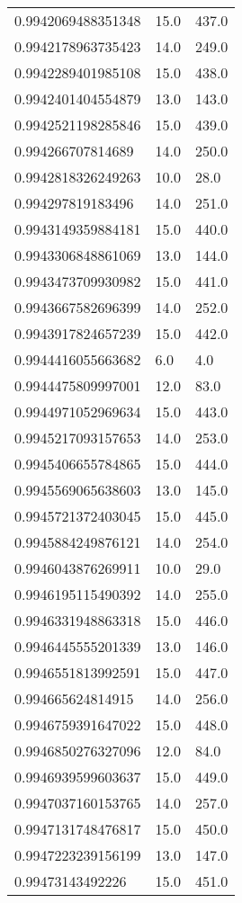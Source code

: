 \begin{center}
\begin{supertabular}[H]{p{0.30\textwidth}p{0.05\textwidth}p{0.05\textwidth}}
0.9942069488351348 & 15.0 & 437.0 \\ 
0.9942178963735423 & 14.0 & 249.0 \\ 
0.9942289401985108 & 15.0 & 438.0 \\ 
0.9942401404554879 & 13.0 & 143.0 \\ 
0.9942521198285846 & 15.0 & 439.0 \\ 
0.994266707814689 & 14.0 & 250.0 \\ 
0.9942818326249263 & 10.0 & 28.0 \\ 
0.994297819183496 & 14.0 & 251.0 \\ 
0.9943149359884181 & 15.0 & 440.0 \\ 
0.9943306848861069 & 13.0 & 144.0 \\ 
0.9943473709930982 & 15.0 & 441.0 \\ 
0.9943667582696399 & 14.0 & 252.0 \\ 
0.9943917824657239 & 15.0 & 442.0 \\ 
0.9944416055663682 & 6.0 & 4.0 \\ 
0.9944475809997001 & 12.0 & 83.0 \\ 
0.9944971052969634 & 15.0 & 443.0 \\ 
0.9945217093157653 & 14.0 & 253.0 \\ 
0.9945406655784865 & 15.0 & 444.0 \\ 
0.9945569065638603 & 13.0 & 145.0 \\ 
0.9945721372403045 & 15.0 & 445.0 \\ 
0.9945884249876121 & 14.0 & 254.0 \\ 
0.9946043876269911 & 10.0 & 29.0 \\ 
0.9946195115490392 & 14.0 & 255.0 \\ 
0.9946331948863318 & 15.0 & 446.0 \\ 
0.9946445555201339 & 13.0 & 146.0 \\ 
0.9946551813992591 & 15.0 & 447.0 \\ 
0.994665624814915 & 14.0 & 256.0 \\ 
0.9946759391647022 & 15.0 & 448.0 \\ 
0.9946850276327096 & 12.0 & 84.0 \\ 
0.9946939599603637 & 15.0 & 449.0 \\ 
0.9947037160153765 & 14.0 & 257.0 \\ 
0.9947131748476817 & 15.0 & 450.0 \\ 
0.9947223239156199 & 13.0 & 147.0 \\ 
0.99473143492226 & 15.0 & 451.0 \\ 

\end{supertabular}
\end{center}
